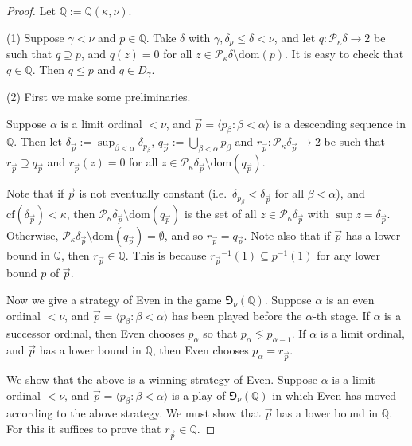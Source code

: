 \documentclass[a4paper,12pt,reqno,oneside]{amsart}
\theoremstyle{plain}
\newcommand{\cof}{\mathrm{cf}}
\newcommand{\mbb}{\mathbb}
\newcommand{\mcal}{\mathcal}
\newcommand{\dom}{\mathrm{dom}}
\begin{document}
\begin{proof}
Let $\mbb{Q} := \mbb{Q} ( \kappa , \nu )$.

\medskip
\noindent
(1) Suppose $\gamma < \nu$ and $p \in \mbb{Q}$. Take $\delta$ with $\gamma , \delta_p \leq \delta < \nu$, and let $q : \mcal{P}_\kappa \delta \to 2$ be such that $q \supseteq p$, and $q(z) = 0$ for all $z \in \mcal{P}_\kappa \delta \setminus \dom (p)$. It is easy to check that $q \in \mbb{Q}$. Then $q \leq p$ and $q \in D_\gamma$.

\medskip
\noindent
(2) First we make some preliminaries.

Suppose $\alpha$ is a limit ordinal $< \nu$, and $\vec{p} = \langle p_\beta : \beta < \alpha \rangle$ is a descending sequence in $\mbb{Q}$. Then let $\delta_{\vec{p}} := \sup_{\beta < \alpha} \delta_{p_\beta}$, $q_{\vec{p}} := \bigcup_{\beta < \alpha} p_\beta$ and $r_{\vec{p}} : \mcal{P}_\kappa \delta_{\vec{p}} \to 2$ be such that $r_{\vec{p}} \supseteq q_{\vec{p}}$ and $r_{\vec{p}} (z) = 0$ for all $z \in \mcal{P}_\kappa \delta_{\vec{p}} \setminus \dom ( q_{\vec{p}} )$.

Note that if $\vec{p}$ is not eventually constant (i.e.~$\delta_{p_\beta} < \delta_{\vec{p}}$ for all $\beta < \alpha$), and $\cof ( \delta_{\vec{p}} ) < \kappa$, then $\mcal{P}_\kappa \delta_{\vec{p}} \setminus \dom ( q_{\vec{p}} )$ is the set of all $z \in \mcal{P}_\kappa \delta_{\vec{p}}$ with $\sup z = \delta_{\vec{p}}$. Otherwise, $\mcal{P}_\kappa \delta_{\vec{p}} \setminus \dom ( q_{\vec{p}} ) = \emptyset$, and so $r_{\vec{p}} = q_{\vec{p}}$.
Note also that if $\vec{p}$ has a lower bound in $\mbb{Q}$, then $r_{\vec{p}} \in \mbb{Q}$. This is because ${r_{\vec{p}}}^{-1} (1) \subseteq p^{-1} (1)$ for any lower bound $p$ of $\vec{p}$.

Now we give a strategy of Even in the game $\Game_\nu ( \mbb{Q} )$. Suppose $\alpha$ is an even ordinal $< \nu$, and $\vec{p} = \langle p_\beta : \beta < \alpha \rangle$ has been played before the $\alpha$-th stage. If $\alpha$ is a successor ordinal, then Even chooses $p_\alpha$ so that $p_\alpha \lneq p_{\alpha -1}$. If $\alpha$ is a limit ordinal, and $\vec{p}$ has a lower bound in $\mbb{Q}$, then Even chooses $p_\alpha = r_{\vec{p}}$.

We show that the above is a winning strategy of Even. Suppose $\alpha$ is a limit ordinal $< \nu$, and $\vec{p} = \langle p_\beta : \beta < \alpha \rangle$ is a play of $\Game_\nu ( \mbb{Q} )$ in which Even has moved according to the above strategy. We must show that $\vec{p}$ has a lower bound in $\mbb{Q}$. For this it suffices to prove that $r_{\vec{p}} \in \mbb{Q}$.


\end{proof}
\end{document}

